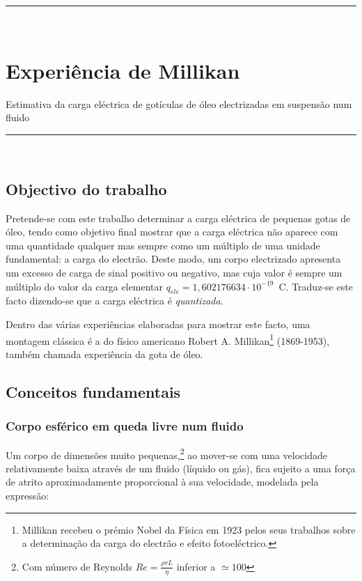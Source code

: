 \documentclass[a4paper,twoside,11pt]{report}      %
\newcommand{\HRule}{\rule{\linewidth}{0.5mm}}
\begin{document}
\HRule \\[0.5cm]		
\chapter{\huge{Experiência de Millikan}}
\large {Estimativa da carga eléctrica de gotículas de óleo electrizadas em suspensão num fluido} \\
	\HRule \\%

\section{\sf Objectivo do trabalho}
Pretende-se com este trabalho determinar a carga eléctrica de pequenas gotas de óleo, tendo como objetivo final mostrar que a carga eléctrica não aparece com uma quantidade qualquer mas sempre como um múltiplo de uma unidade fundamental: a carga do electrão. Deste modo, um corpo electrizado apresenta um excesso de carga de sinal positivo ou negativo, mas cuja valor é sempre um múltiplo do valor da carga elementar $q_{ele}= 1,602176634\cdot 10^{-19}\,$ C.
Traduz-se este facto dizendo-se que a carga eléctrica é \emph{quantizada}.

Dentro das várias experiências elaboradas para mostrar este facto, uma montagem clássica é a do físico americano Robert A. Millikan\footnote{Millikan recebeu o prémio Nobel da Física em 1923 pelos seus trabalhos sobre a determinação da carga do electrão e efeito fotoeléctrico.} (1869-1953), também chamada experiência da gota de óleo.

\section{\sf Conceitos fundamentais}
\subsection{\sf Corpo esférico em queda livre num fluido}
Um corpo de dimensões muito pequenas,\footnote{Com número de Reynolds $Re= \frac{\rho v L}{\eta}$ inferior a $\simeq 100$}  ao mover-se com uma velocidade relativamente baixa através de um fluido (líquido ou gás), fica sujeito a uma força de atrito aproximadamente proporcional à sua velocidade, modelada pela expressão:
\end{document}

